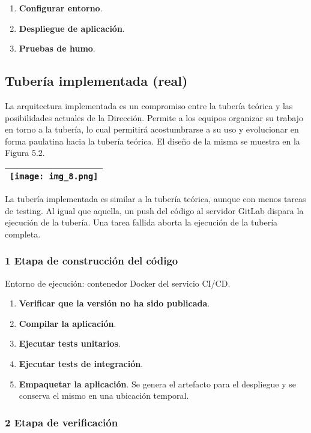 \begin{enumerate}
\item \textbf{Configurar entorno}.
\item \textbf{Despliegue de aplicación}.
\item \textbf{Pruebas de humo}.
\end{enumerate}
\subsection{Tubería implementada (real) }

La arquitectura implementada es un compromiso entre la tubería teórica
y las posibilidades actuales de la Dirección. Permite a los equipos
organizar su trabajo en torno a la tubería, lo cual permitirá
acostumbrarse a su uso y evolucionar en forma paulatina hacia la
tubería teórica. El diseño de la misma se muestra en la Figura 5.2.

\begin{tabular}{|l|}
\hline \texttt{[image: img\_8.png]}


\e{Figura 5.2. Tubería implementada} \\ \hline
\end{tabular}
La tubería implementada es similar a la tubería teórica, aunque con
menos tareas de testing. Al igual que aquella, un push del código al
servidor GitLab dispara la ejecución de la tubería. Una tarea fallida
aborta la ejecución de la tubería completa.

\subsubsection{1 Etapa de construcción del código}

Entorno de ejecución: contenedor Docker del servicio CI/CD.

\begin{enumerate}
\item \textbf{Verificar que la versión no ha sido publicada}.
\item \textbf{Compilar la aplicación}.
\item \textbf{Ejecutar tests unitarios}.
\item \textbf{Ejecutar tests de integración}.
\item \textbf{Empaquetar la aplicación}. Se genera el artefacto para
  el despliegue y se conserva el mismo en una ubicación temporal.
\end{enumerate}
\subsubsection{2 Etapa de verificación}


